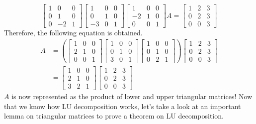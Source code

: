 \documentclass[../../main.tex]{subfiles}
\begin{document}
\[
\begin{bmatrix}
    1 & 0  & 0 \\
    0 & 1  & 0 \\
    0 & -2 & 1
\end{bmatrix}
\begin{bmatrix}
    1  & 0 & 0 \\
    0  & 1 & 0 \\
    -3 & 0 & 1
\end{bmatrix}
\begin{bmatrix}
    1  & 0 & 0 \\
    -2 & 1 & 0 \\
    0  & 0 & 1
\end{bmatrix}
A
=
\begin{bmatrix}
    1 & 2 & 3 \\
    0 & 2 & 3 \\
    0 & 0 & 3
\end{bmatrix}
\]
Therefore, the following equation is obtained.
\begin{align*}
    A
    &=
    \left(
    \begin{bmatrix}
        1 & 0 & 0 \\
        2 & 1 & 0 \\
        0 & 0 & 1
    \end{bmatrix}
    \begin{bmatrix}
        1 & 0 & 0 \\
        0 & 1 & 0 \\
        3 & 0 & 1
    \end{bmatrix}
    \begin{bmatrix}
        1 & 0 & 0 \\
        0 & 1 & 0 \\
        0 & 2 & 1
    \end{bmatrix}
    \right)
    \begin{bmatrix}
        1 & 2 & 3 \\
        0 & 2 & 3 \\
        0 & 0 & 3
    \end{bmatrix} \\
    &=
    \begin{bmatrix}
        1 & 0 & 0 \\
        2 & 1 & 0 \\
        3 & 2 & 1
    \end{bmatrix}
    \begin{bmatrix}
        1 & 2 & 3 \\
        0 & 2 & 3 \\
        0 & 0 & 3
    \end{bmatrix}
\end{align*}
$A$ is now represented as the product of lower and upper triangular
matrices! Now that we know how LU decomposition works, let's take
a look at an important lemma on triangular matrices to prove a
theorem on LU decomposition.
\end{document}
